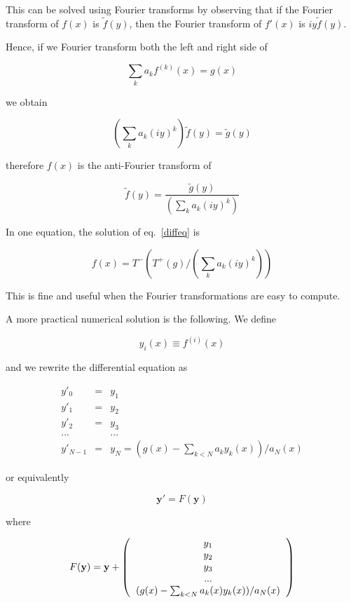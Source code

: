 \documentclass[justified,sixbynine]{tufte-book}
\theoremstyle{plain}%
\theoremstyle{definition}
\theoremstyle{remark}
\begin{document}
\begin{fullwidth}
This can be solved using Fourier transforms by observing that if the Fourier transform of $f(x)$ is $\tilde f(y)$, then the Fourier transform of $f'(x)$ is $iy\tilde f(y)$.

Hence, if we Fourier transform both the left and right side of

\begin{equation}
\sum _k a_k f^{(k)}(x) = g(x)
\end{equation}

we obtain

\begin{equation}
(\sum _k a_k (i y)^k) \tilde f(y) = \tilde g(y)
\end{equation}

therefore $f(x)$ is the anti-Fourier transform of

\begin{equation}
\tilde f(y) = \frac{\tilde g(y)}{(\sum _k a_k (i y)^k)}
\end{equation}

In one equation, the solution of eq.~\ref{diffeq} is

\begin{equation}
f(x) = T^-(T^+(g)/(\sum _k a_k (iy)^k))
\end{equation}

This is fine and useful when the Fourier transformations are easy to compute.

A more practical numerical solution is the following. We define

\begin{equation}
y_i(x) \equiv f^{(i)}(x)
\end{equation}

and we rewrite the differential equation as

\begin{eqnarray}
y'_0 &=& y_1 \\
y'_1 &=& y_2 \\
y'_2 &=& y_3 \\
... && ... \\
y'_{N-1} &=& y_N = (g(x)-\sum_{k<N} a_k y_k(x))/a_N(x)
\end{eqnarray}

or equivalently

\begin{equation}
\mathbf{y}' = F(\mathbf{y})
\end{equation}

where

\begin{equation}
F(\mathbf{y}) = \mathbf{y}+\left(\begin{tabular}{c}
$y_1$ \\
$y_2$ \\
$y_3$ \\
... \\
$(g(x)-\sum_{k<N} a_k(x)y_k(x))/a_N(x)$
\end{tabular}\right)
\end{equation}


\end{fullwidth}
\end{document}
